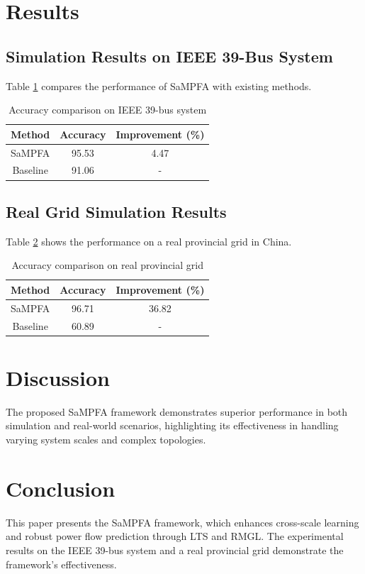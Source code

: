 \documentclass{article}
\begin{document}
\section{Results}
\subsection{Simulation Results on IEEE 39-Bus System}
Table \ref{tab:ieee39bus} compares the performance of SaMPFA with existing methods.

\begin{table}[ht]
\centering
\begin{tabular}{|c|c|c|}
\hline
Method & Accuracy & Improvement (\%) \\
\hline
SaMPFA & 95.53 & 4.47 \\
Baseline & 91.06 & - \\
\hline
\end{tabular}
\caption{Accuracy comparison on IEEE 39-bus system}
\label{tab:ieee39bus}
\end{table}

\subsection{Real Grid Simulation Results}
Table \ref{tab:real_grid} shows the performance on a real provincial grid in China.

\begin{table}[ht]
\centering
\begin{tabular}{|c|c|c|}
\hline
Method & Accuracy & Improvement (\%) \\
\hline
SaMPFA & 96.71 & 36.82 \\
Baseline & 60.89 & - \\
\hline
\end{tabular}
\caption{Accuracy comparison on real provincial grid}
\label{tab:real_grid}
\end{table}

\section{Discussion}
The proposed SaMPFA framework demonstrates superior performance in both simulation and real-world scenarios, highlighting its effectiveness in handling varying system scales and complex topologies.

\section{Conclusion}
This paper presents the SaMPFA framework, which enhances cross-scale learning and robust power flow prediction through LTS and RMGL. The experimental results on the IEEE 39-bus system and a real provincial grid demonstrate the framework's effectiveness.
\end{document}
